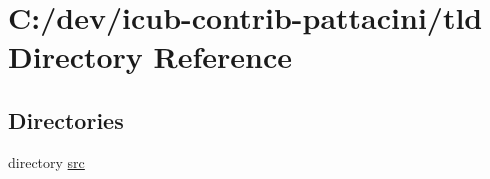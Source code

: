 \section{C\+:/dev/icub-\/contrib-\/pattacini/tld Directory Reference}
\label{dir_77cfe392cee2aff49d0fb7762903fa79}
\subsection*{Directories}
\begin{DoxyCompactItemize}
\item 
directory \hyperlink{dir_6a35aff29eb89fc3678e61225e4ed9ab}{src}
\end{DoxyCompactItemize}
